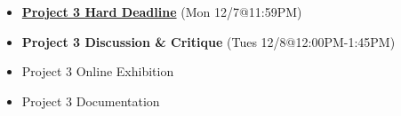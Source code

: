 \def\dMon{4/19}%
\def\dTues{4/20}%
\def\dWed{4/21}%
\def\dThur{4/22}%
\placeDate

\def\mon{12/7}%
\def\tues{12/8}%
% 
\begin{itemize}[noitemsep,topsep=0pt,leftmargin=*]
    \item \textcolor{defaultColor}{\ul{\textbf{Project 3 Hard Deadline}} (Mon \mon @11:59PM)}
    \item \textcolor{defaultColor}{\textbf{Project 3 Discussion \& Critique} (Tues \tues @12:00PM-1:45PM)}
    \item Project 3 Online Exhibition
    \item Project 3 Documentation
\end{itemize}